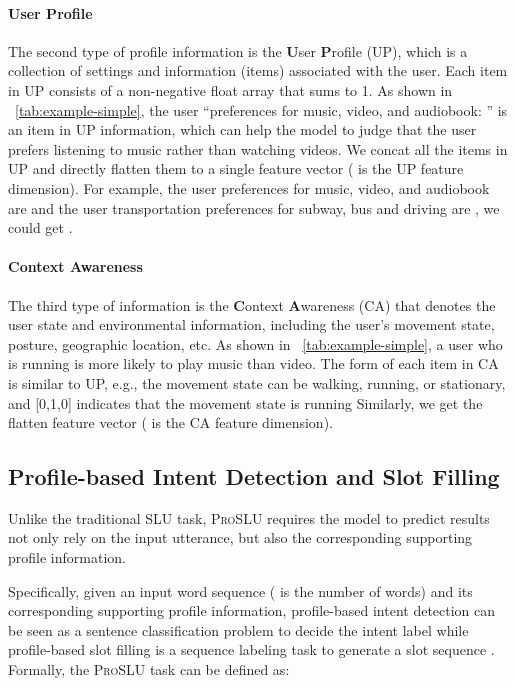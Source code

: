 \documentclass[letterpaper]{article} \usepackage{aaai22}  \usepackage{times}  \usepackage{helvet}  \usepackage{courier}  \usepackage[hyphens]{url}  \usepackage{graphicx} \urlstyle{rm} \def\UrlFont{\rm}  \usepackage{natbib}  \usepackage{caption} \DeclareCaptionStyle{ruled}{labelfont=normalfont,labelsep=colon,strut=off} \frenchspacing  \setlength{\pdfpagewidth}{8.5in}  \setlength{\pdfpageheight}{11in}  \usepackage{algorithm}
\begin{document}
\paragraph{User Profile}
The second type of profile information is the \textbf{U}ser \textbf{P}rofile (UP), 
which is a collection of settings and information (items) associated with the user.
Each item in UP consists of a non-negative float array that sums to 1.
As shown in \tablename~\ref{tab:example-simple}, the user ``preferences for music, video, and audiobook: '' is an item in UP information, which can help the model to judge that the user prefers listening to music rather than watching videos. 
We concat all the items in UP and directly flatten them to a single feature vector  ( is the UP feature dimension).
For example, the user preferences for music, video, and audiobook are  and the user transportation preferences for subway, bus and driving are , we could get .

\paragraph{Context Awareness}
The third type of information is the \textbf{C}ontext \textbf{A}wareness (CA) that denotes the user state and environmental information,
including the user's movement state, posture, geographic location, etc.
As shown in \tablename~\ref{tab:example-simple}, a user who is running is more likely to play music than video. 
The form of each item in CA is similar to UP, e.g., the movement state can be walking, running, or stationary, and [0,1,0] indicates that the movement state is running
Similarly, we get the flatten feature vector  ( is the CA feature dimension).

\subsection{Profile-based Intent Detection and Slot Filling}
\label{sec:definition-SLU}
Unlike the traditional SLU task, \textsc{ProSLU} requires the model to predict results not only rely on the input utterance, but also the corresponding supporting profile information.

Specifically, given an input word sequence  ( is the number of words) and its corresponding supporting profile information, 
profile-based intent detection can be seen as a sentence classification problem to decide the intent label  while profile-based slot filling is a sequence labeling task to generate a slot sequence .
Formally, the \textsc{ProSLU} task can be defined as:
\end{document}

